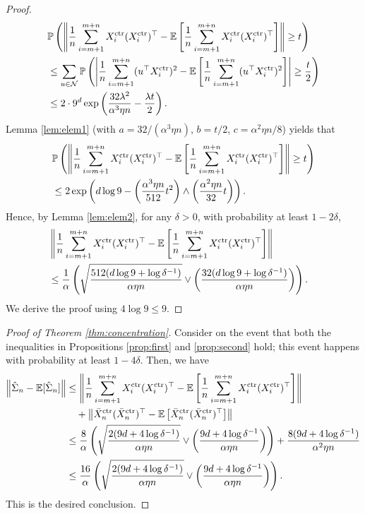 \documentclass[12pt,reqno]{amsart}
\theoremstyle{remark}
\theoremstyle{definition}
\newcommand{\calN}{\mathcal{N}}
\newcommand{\E}{\mathbb{E}}
\renewcommand{\Pr}{\mathbb{P}}
\newcommand{\ctr}{\textnormal{ctr}}
\begin{document}
\begin{proof}
    \begin{align*}
        &\Pr\left(\left\|\frac{1}{n}\sum_{i=m+1}^{m+n}X_{i}^{\ctr}(X_{i}^{\ctr})^{\top}-\E\left[\frac{1}{n}\sum_{i=m+1}^{m+n}X_{i}^{\ctr}(X_{i}^{\ctr})^{\top}\right]\right\|\ge t\right)\\
        &\le \sum_{u\in\calN}\Pr\left(\left|\frac{1}{n}\sum_{i=m+1}^{m+n}(u^{\top}X_{i}^{\ctr})^{2}-\E\left[\frac{1}{n}\sum_{i=m+1}^{m+n}(u^{\top}X_{i}^{\ctr})^{2}\right]\right|\ge \frac{t}{2}\right)\\
        &\le 2\cdot 9^{d}\exp\left(\frac{32\lambda^{2}}{\alpha^{3}\eta n}-\frac{\lambda t}{2}\right).
    \end{align*}
    Lemma \ref{lem:elem1} (with $a=32/(\alpha^{3}\eta n)$, $b=t/2$, $c=\alpha^{2}\eta n/8$) yields that
    \begin{align*}
        &\Pr\left(\left\|\frac{1}{n}\sum_{i=m+1}^{m+n}X_{i}^{\ctr}(X_{i}^{\ctr})^{\top}-\E\left[\frac{1}{n}\sum_{i=m+1}^{m+n}X_{i}^{\ctr}(X_{i}^{\ctr})^{\top}\right]\right\|\ge t\right)\\
        &\le 2\exp\left(d\log 9-\left(\frac{\alpha^{3}\eta n}{512}t^{2}\right)\wedge \left(\frac{\alpha^{2}\eta n}{32}t\right)\right).
    \end{align*}
    Hence, by Lemma \ref{lem:elem2}, for any $\delta>0$, with probability at least $1-2\delta$,
    \begin{align*}
        &\left\|\frac{1}{n}\sum_{i=m+1}^{m+n}X_{i}^{\ctr}(X_{i}^{\ctr})^{\top}-\E\left[\frac{1}{n}\sum_{i=m+1}^{m+n}X_{i}^{\ctr}(X_{i}^{\ctr})^{\top}\right]\right\|&\\
        &\le \frac{1}{\alpha}\left(\sqrt{\frac{512(d\log9+\log\delta^{-1})}{\alpha\eta n}}\vee \left(\frac{32(d\log9+\log\delta^{-1})}{\alpha\eta n}\right)\right).
    \end{align*}
    We derive the proof using $4\log9\le 9$.
\end{proof}

\begin{proof}[Proof of Theorem \ref{thm:concentration}]
    Consider on the event that both the inequalities in Propositions \ref{prop:first} and \ref{prop:second} hold; this event happens with probability at least $1-4\delta$. 
    Then, we have
    \begin{align*}
        \left\|\hat{\Sigma}_{n}-\E[\hat{\Sigma}_{n}]\right\|
        &\le \left\|\frac{1}{n}\sum_{i=m+1}^{m+n}X_{i}^{\ctr}(X_{i}^{\ctr})^{\top}-\E\left[\frac{1}{n}\sum_{i=m+1}^{m+n}X_{i}^{\ctr}(X_{i}^{\ctr})^{\top}\right]\right\|\\
        &\quad+\left\|\bar{X}_{n}^{\ctr}(\bar{X}_{n}^{\ctr})^{\top}-\E\left[\bar{X}_{n}^{\ctr}(\bar{X}_{n}^{\ctr})^{\top}\right]\right\|\\
        &\le \frac{8}{\alpha}\left(\sqrt{\frac{2(9d+4\log\delta^{-1})}{\alpha\eta n}}\vee \left(\frac{9 d+4\log\delta^{-1}}{\alpha\eta n}\right)\right)+\frac{8 (9 d+4\log\delta^{-1})}{\alpha^{2}\eta n}\\
        &\le \frac{16}{\alpha}\left(\sqrt{\frac{2(9d+4\log\delta^{-1})}{\alpha\eta n}}\vee \left(\frac{9 d+4\log\delta^{-1}}{\alpha\eta n}\right)\right).
    \end{align*}
    This is the desired conclusion.
\end{proof}
\end{document}
